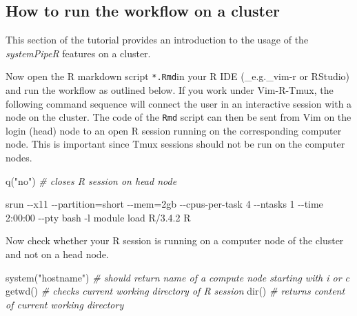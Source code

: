 \documentclass[14pt,]{article}
\newcommand{\hlstr}[1]{\textcolor[rgb]{0.251,0.627,0.251}{#1}}%
\newcommand{\hlcom}[1]{\textcolor[rgb]{0.502,0.502,0.502}{\textit{#1}}}%
\newcommand{\hlstd}[1]{\textcolor[rgb]{0.251,0.251,0.251}{#1}}%
\newenvironment{Shaded}{\begin{myshaded}}{\end{myshaded}}
\newcommand{\StringTok}[1]{\hlstr{#1}}
\newcommand{\CommentTok}[1]{\hlcom{#1}}
\newcommand{\FunctionTok}[1]{\hlstd{#1}}
\newcommand{\ExtensionTok}[1]{{#1}}
\newcommand{\NormalTok}[1]{\hlstd{#1}}
\begin{document}
\hypertarget{how-to-run-the-workflow-on-a-cluster}{%
\subsection{How to run the workflow on a cluster}\label{how-to-run-the-workflow-on-a-cluster}}

This section of the tutorial provides an introduction to the usage of the \emph{systemPipeR} features on a cluster.

Now open the R markdown script \texttt{*.Rmd}in your R IDE (\_e.g.\_vim-r or RStudio) and run the workflow as outlined below. If you work under Vim-R-Tmux, the following command sequence will connect the user in an
interactive session with a node on the cluster. The code of the \texttt{Rmd}
script can then be sent from Vim on the login (head) node to an open R session running
on the corresponding computer node. This is important since Tmux sessions
should not be run on the computer nodes.

\begin{Shaded}
\begin{Highlighting}[]
\FunctionTok{q}\NormalTok{(}\StringTok{"no"}\NormalTok{)  }\CommentTok{\# closes R session on head node}
\end{Highlighting}
\end{Shaded}

\begin{Shaded}
\begin{Highlighting}[]
\ExtensionTok{srun}\NormalTok{ {-}{-}x11 {-}{-}partition=short {-}{-}mem=2gb {-}{-}cpus{-}per{-}task 4 {-}{-}ntasks 1 {-}{-}time 2:00:00 {-}{-}pty bash {-}l}
\ExtensionTok{module}\NormalTok{ load R/3.4.2}
\ExtensionTok{R}
\end{Highlighting}
\end{Shaded}

Now check whether your R session is running on a computer node of the cluster and not on a head node.

\begin{Shaded}
\begin{Highlighting}[]
\FunctionTok{system}\NormalTok{(}\StringTok{"hostname"}\NormalTok{)  }\CommentTok{\# should return name of a compute node starting with i or c }
\FunctionTok{getwd}\NormalTok{()  }\CommentTok{\# checks current working directory of R session}
\FunctionTok{dir}\NormalTok{()  }\CommentTok{\# returns content of current working directory}
\end{Highlighting}
\end{Shaded}
\end{document}

